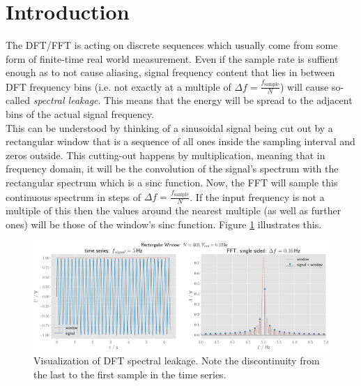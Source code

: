 \documentclass[10pt, a4paper]{article}
\begin{document}


\section{Introduction}
The DFT/FFT is acting on discrete sequences which usually come from some form of finite-time real world measurement. Even if the sample rate is suffient enough as to not cause aliasing, signal frequency content that lies in between DFT frequency bins (i.e. not exactly at a multiple of $\Delta f = \frac{f_{\text{sample}}}{N}$) will cause so-called \textit{spectral leakage}. This means that the energy will be spread to the adjacent bins of the actual signal frequency.
\\

This can be understood by thinking of a sinusoidal signal being cut out by a rectangular window that is a sequence of all ones inside the sampling interval and zeros outside. This cutting-out happens by multiplication, meaning that in frequency domain, it will be the convolution of the signal's spectrum with the rectangular spectrum which is a sinc function. Now, the FFT will sample this continuous spectrum in steps of $\Delta f = \frac{f_{\text{sample}}}{N}$. If the input frequency is not a multiple of this then the values around the nearest multiple (as well as further ones) will be those of the window's sinc function. Figure \ref{fig:intro1} illustrates this.\\%

\begin{figure}[h]
  \centering
  \includegraphics[width=\textwidth]{graphics/intro.pdf}
  \caption{Visualization of DFT spectral leakage. Note the discontinuity from the last to the first sample in the time series.}\label{fig:intro1}
\end{figure}
\end{document}
